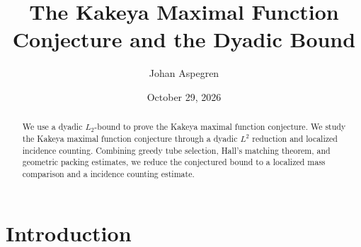 \documentclass[11pt, letterpaper]{nyjm}
\title{The Kakeya Maximal Function Conjecture and the Dyadic Bound}
\author{Johan Aspegren}
\date{October 29, 2026}
\begin{document}
	
	\begin{abstract}
		We use a dyadic $L_2$-bound to prove the Kakeya maximal function conjecture. We study the Kakeya maximal function conjecture through a dyadic \(L^2\) reduction and localized incidence counting. Combining greedy tube selection, Hall's matching theorem, and geometric packing estimates, we reduce the conjectured bound to a localized mass comparison and a incidence counting estimate.  
	\end{abstract}
	
	\maketitle
	
	\tableofcontents
	
	
	\section{Introduction}
	
\end{document}
